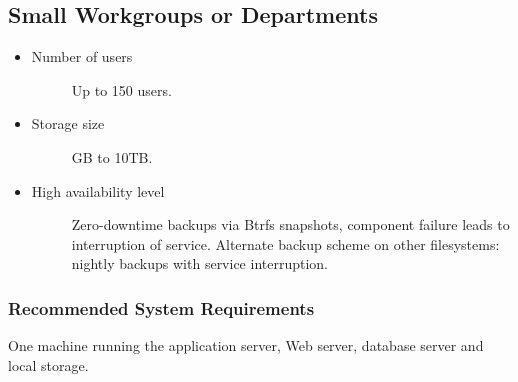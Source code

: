 \documentclass[letterpaper,10pt,english]{sphinxmanual}
\begin{document}
\subsection{Small Workgroups or Departments}
\label{installation/deployment_recommendations:small-workgroups-or-departments}\begin{itemize}
\item {} \begin{description}
\item[{Number of users}] \leavevmode
Up to 150 users.

\end{description}

\item {} \begin{description}
\item[{Storage size}]  GB to 10TB.

\end{description}

\item {} \begin{description}
\item[{High availability level}] \leavevmode
Zero-downtime backups via Btrfs snapshots, component failure leads to
interruption of service. Alternate backup scheme on other filesystems:
nightly backups with service interruption.

\end{description}

\end{itemize}


\subsubsection{Recommended System Requirements}
\label{installation/deployment_recommendations:recommended-system-requirements}
One machine running the application server, Web server, database server and
local storage.
\end{document}
